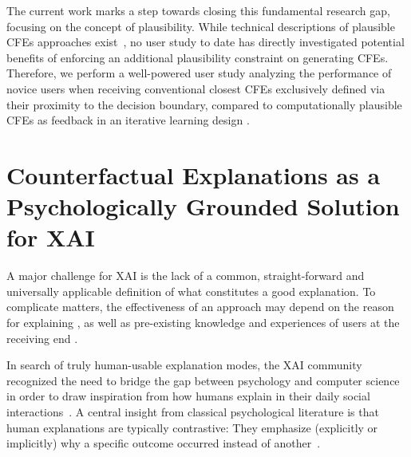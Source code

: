 The current work marks a step towards closing this fundamental research gap, focusing on the concept of plausibility.
While technical descriptions of plausible \glspl{CFE} approaches exist~\citep{smyth_few_2021,schleich_geco_2021,artelt_efficient_2022}, no user study to date has directly investigated potential benefits of enforcing an additional plausibility constraint on generating \glspl{CFE}.
Therefore, we perform a well-powered user study analyzing the performance of novice users when receiving conventional closest \glspl{CFE} exclusively defined via their proximity to the decision boundary, compared to computationally plausible \glspl{CFE} as feedback in an iterative learning design \citep{artelt_counterfactual_2020, artelt_efficient_2022}.

\section{Counterfactual Explanations as a Psychologically Grounded Solution for XAI}\label{subsec:psychoCFs}

A major challenge for \gls{XAI} is the lack of a common, straight-forward and universally applicable definition of what constitutes a good explanation.
To complicate matters, the effectiveness of an approach may depend on the reason for explaining \citep{adadi_peeking_2018}, as well as pre-existing knowledge and experiences of users at the receiving end \citep{van_der_waa_evaluating_2021}.

In search of truly human-usable explanation modes, the \gls{XAI} community recognized the need to bridge the gap between psychology and computer science in order to draw inspiration from how humans explain in their daily social interactions~\citep{miller_explanation_2019}.
A central insight from classical psychological literature is that human explanations are typically contrastive: They emphasize (explicitly or implicitly) why a specific outcome occurred instead of another~\citep{miller_explanation_2019, lipton_contrastive_1990, lombrozo_explanation_2012, hilton_knowledge-based_1986}.

